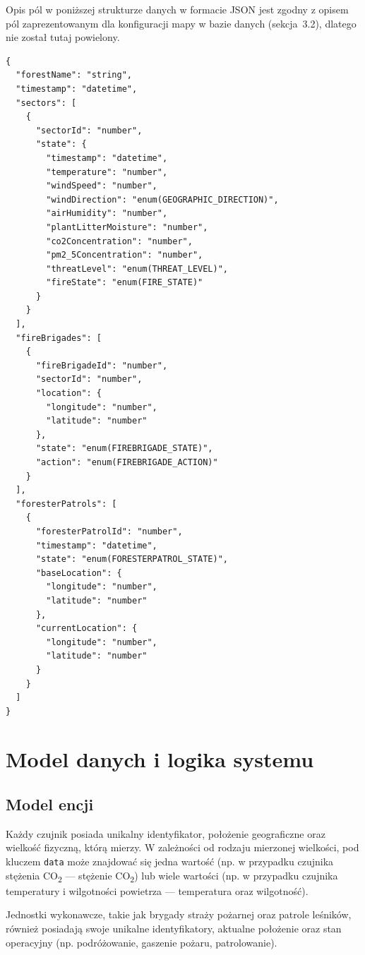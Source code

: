 Opis pól w poniższej strukturze danych w formacie JSON jest zgodny z opisem pól zaprezentowanym dla konfiguracji mapy w bazie danych (sekcja~3.2), dlatego nie został tutaj powielony.

\begin{verbatim}
{
  "forestName": "string",
  "timestamp": "datetime",
  "sectors": [
    {
      "sectorId": "number",
      "state": {
        "timestamp": "datetime",
        "temperature": "number",
        "windSpeed": "number",
        "windDirection": "enum(GEOGRAPHIC_DIRECTION)",
        "airHumidity": "number",
        "plantLitterMoisture": "number",
        "co2Concentration": "number",
        "pm2_5Concentration": "number",
        "threatLevel": "enum(THREAT_LEVEL)",
        "fireState": "enum(FIRE_STATE)"
      }
    }
  ],
  "fireBrigades": [
    {
      "fireBrigadeId": "number",
      "sectorId": "number",
      "location": {
        "longitude": "number",
        "latitude": "number"
      },
      "state": "enum(FIREBRIGADE_STATE)",
      "action": "enum(FIREBRIGADE_ACTION)"
    }
  ],
  "foresterPatrols": [
    {
      "foresterPatrolId": "number",
      "timestamp": "datetime",
      "state": "enum(FORESTERPATROL_STATE)",
      "baseLocation": {
        "longitude": "number",
        "latitude": "number"
      },
      "currentLocation": {
        "longitude": "number",
        "latitude": "number"
      }
    }
  ]
}
\end{verbatim}

\section{Model danych i logika systemu}

\subsection{Model encji}

Każdy czujnik posiada unikalny identyfikator, położenie geograficzne oraz wielkość fizyczną, którą mierzy. W zależności od rodzaju mierzonej wielkości, pod kluczem \texttt{data} może znajdować się jedna wartość (np. w przypadku czujnika stężenia CO\textsubscript{2} — stężenie CO\textsubscript{2}) lub wiele wartości (np. w przypadku czujnika temperatury i wilgotności powietrza — temperatura oraz wilgotność).

Jednostki wykonawcze, takie jak brygady straży pożarnej oraz patrole leśników, również posiadają swoje unikalne identyfikatory, aktualne położenie oraz stan operacyjny (np. podróżowanie, gaszenie pożaru, patrolowanie).

